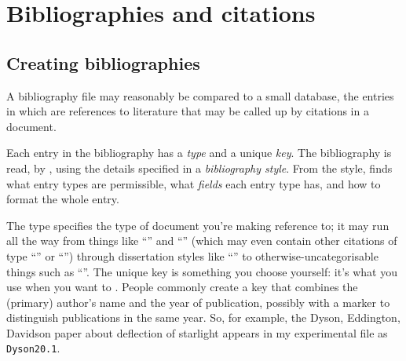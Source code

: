 
\section{Bibliographies and citations}

\subsection{Creating bibliographies}


A \BibTeX{} bibliography file may reasonably be compared to a small
database, the entries in which are references to literature that may
be called up by citations in a document.

Each entry in the bibliography has a \emph{type} and a unique
\emph{key}.  The bibliography is read, by \BibTeX{}, using the details
specified in a \emph{bibliography style}.  From the style, \BibTeX{}
finds what entry types are permissible, what \emph{fields} each entry
type has, and how to format the whole entry.

The type specifies the type of document you're making reference to; it
may run all the way from things like ``'' and
``'' (which may even contain other citations
of type ``'' or  ``'')
through dissertation styles like  ``'' to
otherwise-uncategorisable things such as ``''.  The
unique key is something you choose yourself: it's what you use when
you want to .  People
commonly create a key that combines the (primary) author's name and
the year of publication, possibly with a marker to distinguish
publications in the same year.  So, for example, the Dyson, Eddington,
Davidson paper about deflection of starlight appears in my
experimental  file as \texttt{Dyson20.1}.

